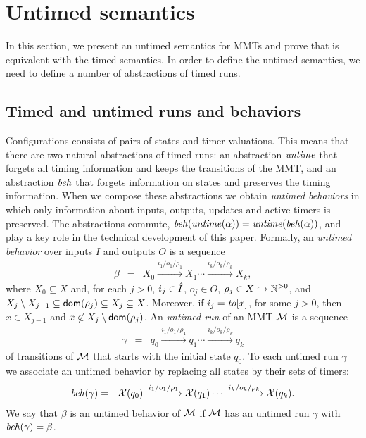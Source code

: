 \section{Untimed semantics}
\label{section untimed semantics}
In this section, we present an untimed semantics for MMTs and prove that is equivalent with the timed semantics.
In order to define the untimed semantics, we need to define a number of abstractions of timed runs.

\subsection{Timed and untimed runs and behaviors}
Configurations consists of pairs of states and timer valuations. This means that there are two natural abstractions of
timed runs: an abstraction $\mathit{untime}$ that forgets all timing information and keeps the transitions of the MMT, 
and an abstraction $\mathit{beh}$ that forgets information on states and preserves the timing information.
When we compose these abstractions we obtain \emph{untimed behaviors} in which only information about inputs, outputs,
updates and active timers is preserved.
The abstractions commute, $\mathit{beh}(\mathit{untime}(\alpha))=\mathit{untime}(\mathit{beh}(\alpha))$, and play a key role in
the technical development of this paper.
%
Formally, an \emph{untimed behavior} over inputs $I$ and outputs $O$ is a sequence 
\begin{eqnarray*}
\beta & = & X_0 \xrightarrow{i_1/o_1/\rho_1} X_1  \cdots \xrightarrow{i_k/o_k/\rho_k} X_{k},
\end{eqnarray*}
where $X_0 \subseteq X$ and, for each $j>0$,  $i_j \in \hat{I}$, $o_j \in O$, $\rho_j \in X \hookrightarrow {\mathbb N}^{>0}$, and
 $X_j \setminus X_{j-1}  \subseteq {\textsf{dom}}(\rho_j) \subseteq X_j \subseteq X$.
Moreover, if $i_j = \mathit{to}[x]$, for some $j>0$, then $x \in X_{j-1}$ and $x \not\in X_j \setminus {\textsf{dom}}(\rho_j)$.
%
An \emph{untimed run} of an MMT ${\mathcal M}$ is a sequence
\begin{eqnarray*}
\gamma & = & q_0 \xrightarrow{i_1/o_1/\rho_1} q_1   \cdots \xrightarrow{i_k/o_k/\rho_k} q_k
\end{eqnarray*}
of transitions of ${\mathcal M}$ that starts with the initial state $q_0$. 
To each untimed run $\gamma$ we associate an untimed behavior by replacing all
states by their sets of timers:
\begin{eqnarray*}
\mathit{beh}(\gamma) & = & \mathcal{X}(q_0) \xrightarrow{i_1/o_1/\rho_1} \mathcal{X}(q_1)  \cdots \xrightarrow{i_k/o_k/\rho_k} \mathcal{X}(q_k).
\end{eqnarray*}
We say that $\beta$ is an untimed behavior of ${\mathcal M}$ if ${\mathcal M}$ has an untimed run $\gamma$ with $\mathit{beh}(\gamma) = \beta$.
